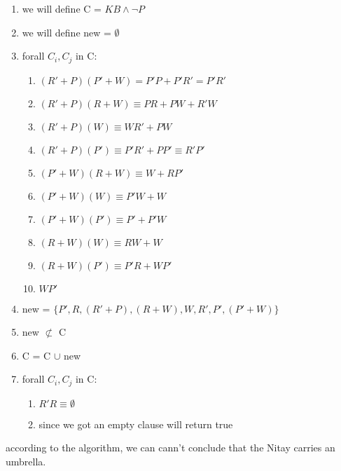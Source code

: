 \documentclass{article}
\begin{document}
\begin{enumerate}
    \item we will define C = $KB \land \neg P$ 
    \item we will define new = $\emptyset$
    \item forall $C_i, C_j$ in C:
    \begin{enumerate}
        \item $(R'+P)(P'+W) = P'P+P'R' = P'R'$
        \item $(R'+P)(R+W) \equiv PR+PW+R'W$ 
        \item $(R'+P)(W) \equiv WR'+PW$ 
        \item $(R'+P)(P') \equiv P'R'+PP'\equiv R'P'$ 
        \item $(P'+W)(R+W) \equiv W+RP' $ 
        \item $(P'+W)(W) \equiv  P'W+W$ 
        \item $(P'+W)(P') \equiv P'+P'W $ 
        \item $(R+W)(W) \equiv RW+W $ 
        \item $(R+W)(P') \equiv P'R+WP'$ 
        \item $WP'$
    \end{enumerate}
    \item new = $\{P',R,(R'+P),(R+W),W,R',P',(P'+W)\}$
    \item new $\not\subset$ C
    \item C = C $\cup$ new
    \item forall $C_i, C_j$ in C:
    \begin{enumerate}
        \item $R'R \equiv \emptyset$
        \item since we got an empty clause will return true
    \end{enumerate}
\end{enumerate}
according to the algorithm, we can cann't conclude that the Nitay carries an umbrella.
\end{document}
